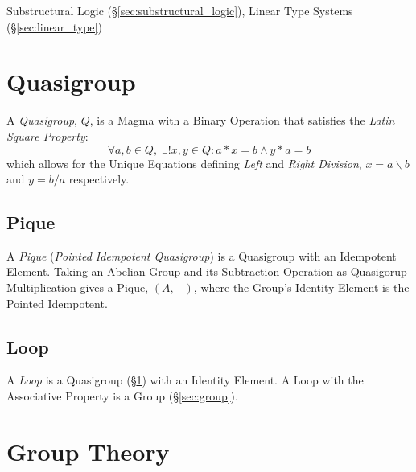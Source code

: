 Substructural Logic (\S\ref{sec:substructural_logic}), Linear Type
Systems (\S\ref{sec:linear_type})



\section{Quasigroup}\label{sec:quasigroup}

A \emph{Quasigroup}, $Q$, is a Magma with a Binary Operation that satisfies
the \emph{Latin Square Property}:
\[
  \forall a, b \in Q,\;\exists ! x,y \in Q : a * x = b \wedge y * a = b
\]
which allows for the Unique Equations defining \emph{Left} and
\emph{Right Division}, $x = a \backslash b$ and $y = b / a$
respectively.



\subsection{Pique}\label{sec:pique}

A \emph{Pique} (\emph{Pointed Idempotent Quasigroup}) is a Quasigroup
with an Idempotent Element. Taking an Abelian Group and its
Subtraction Operation as Quasigorup Multiplication gives a Pique,
$(A,-)$, where the Group's Identity Element is the Pointed Idempotent.



\subsection{Loop}\label{sec:quasigroup_loop}

A \emph{Loop} is a Quasigroup (\S\ref{sec:quasigroup}) with an
Identity Element. A Loop with the Associative Property is a Group
(\S\ref{sec:group}).



\section{Group Theory}\label{sec:group_theory}

